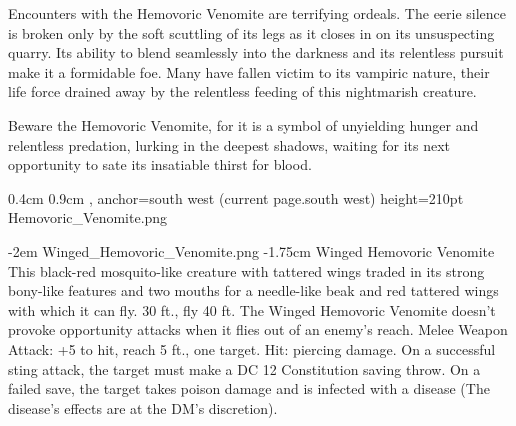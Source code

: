 Encounters with the Hemovoric Venomite are terrifying ordeals. The eerie silence is broken only by the soft scuttling of its legs as it closes in on its unsuspecting quarry. Its ability to blend seamlessly into the darkness and its relentless pursuit make it a formidable foe. Many have fallen victim to its vampiric nature, their life force drained away by the relentless feeding of this nightmarish creature.

Beware the Hemovoric Venomite, for it is a symbol of unyielding hunger and relentless predation, lurking in the deepest shadows, waiting for its next opportunity to sate its insatiable thirst for blood.

%
{0.4cm}%
{0.9cm}%
{, anchor=south west}%
{(current page.south west)}%
{height=210pt}%
{Hemovoric_Venomite.png}%
%

\vfill\eject %

\MonsterVariant%
	{-2em}%
	{Winged_Hemovoric_Venomite.png}%
	{-1.75cm} %
	{Winged Hemovoric Venomite}%
	{%
		This black-red mosquito-like creature with tattered wings traded in its strong bony-like features and two mouths for a needle-like beak and red tattered wings with which it can fly.
		30 ft., fly 40 ft.
		The Winged Hemovoric Venomite doesn't provoke opportunity attacks when it flies out of an enemy's reach.
		Melee Weapon Attack: +5 to hit, reach 5 ft., one target. Hit:  piercing damage. On a successful sting attack, the target must make a DC 12 Constitution saving throw. On a failed save, the target takes  poison damage and is infected with a disease (The disease's effects are at the DM's discretion).
	}%
%

